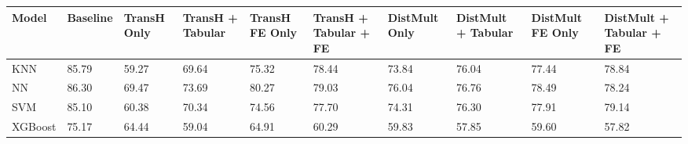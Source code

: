 \begin{tabular}{llllllllll}
\toprule
Model & Baseline & TransH Only & TransH + Tabular & TransH FE Only & TransH + Tabular + FE & DistMult Only & DistMult + Tabular & DistMult FE Only & DistMult + Tabular + FE \\
\midrule
KNN & 85.79 & 59.27 & 69.64 & 75.32 & 78.44 & 73.84 & 76.04 & 77.44 & 78.84 \\
NN & 86.30 & 69.47 & 73.69 & 80.27 & 79.03 & 76.04 & 76.76 & 78.49 & 78.24 \\
SVM & 85.10 & 60.38 & 70.34 & 74.56 & 77.70 & 74.31 & 76.30 & 77.91 & 79.14 \\
XGBoost & 75.17 & 64.44 & 59.04 & 64.91 & 60.29 & 59.83 & 57.85 & 59.60 & 57.82 \\
\bottomrule
\end{tabular}
